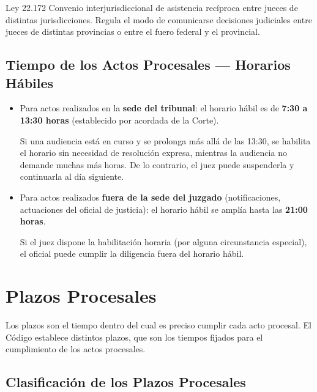 \documentclass[12pt,oneside]{book}
\begin{document}
\begin{definition}{Ley 22.172}
Convenio interjurisdiccional de asistencia recíproca entre jueces de distintas jurisdicciones. Regula el modo de comunicarse decisiones judiciales entre jueces de distintas provincias o entre el fuero federal y el provincial.
\end{definition}

\section{Tiempo de los Actos Procesales --- Horarios Hábiles}

\begin{itemize}
    \item Para actos realizados en la \textbf{sede del tribunal}: el horario hábil es de \textbf{7:30 a 13:30 horas} (establecido por acordada de la Corte).

    Si una audiencia está en curso y se prolonga más allá de las 13:30, se habilita el horario sin necesidad de resolución expresa, mientras la audiencia no demande muchas más horas. De lo contrario, el juez puede suspenderla y continuarla al día siguiente.

    \item Para actos realizados \textbf{fuera de la sede del juzgado} (notificaciones, actuaciones del oficial de justicia): el horario hábil se amplía hasta las \textbf{21:00 horas}.

    Si el juez dispone la habilitación horaria (por alguna circunstancia especial), el oficial puede cumplir la diligencia fuera del horario hábil.
\end{itemize}

\chapter{Plazos Procesales}

Los plazos son el tiempo dentro del cual es preciso cumplir cada acto procesal. El Código establece distintos plazos, que son los tiempos fijados para el cumplimiento de los actos procesales.

\section{Clasificación de los Plazos Procesales}
\end{document}
